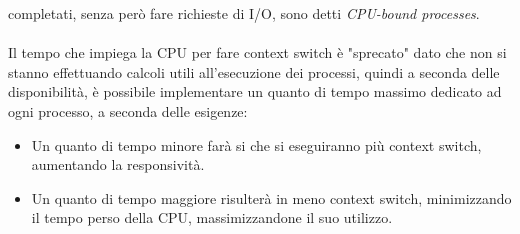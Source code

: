 \documentclass[12pt, letterpaper]{article}
\begin{document}
completati, senza però fare richieste di I/O, sono detti \textit{CPU-bound processes}.
\\\hphantom{}\\ 
Il tempo che impiega la CPU per fare context switch è "sprecato" dato che non si stanno effettuando 
calcoli utili all'esecuzione dei processi, quindi a seconda delle disponibilità, è possibile implementare 
un quanto di tempo massimo dedicato ad ogni processo, a seconda delle esigenze:\begin{itemize}
    \item Un quanto di tempo minore farà si che si eseguiranno più context switch, aumentando la responsività.
    \item Un quanto di tempo maggiore risulterà in meno context switch, minimizzando il tempo perso della CPU, massimizzandone
    il suo utilizzo.
\end{itemize}
\end{document}
